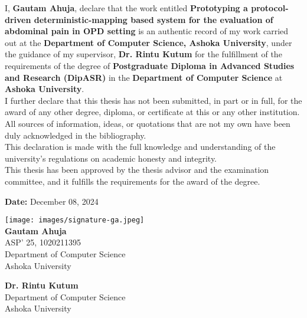 I, \textbf{Gautam Ahuja}, declare that the work entitled \textbf{Prototyping a protocol-driven deterministic-mapping based system for the evaluation of abdominal pain in OPD setting} is an authentic record of my work carried out at the \textbf{Department of Computer Science, Ashoka University}, under the guidance of my supervisor, \textbf{Dr. Rintu Kutum} for the fulfillment of the requirements of the degree of \textbf{Postgraduate Diploma in Advanced Studies and Research (DipASR)} in the \textbf{Department of Computer Science} at \textbf{Ashoka University}. \\%

\noindent I further declare that this thesis has not been submitted, in part or in full, for the award of any other degree, diploma, or certificate at this or any other institution. All sources of information, ideas, or quotations that are not my own have been duly acknowledged in the bibliography. \\ %


\noindent This declaration is made with the full knowledge and understanding of the university's regulations on academic honesty and integrity. \\%


\noindent This thesis has been approved by the thesis advisor and the examination committee, and it fulfills the requirements for the award of the degree.\\%

\begin{flushleft}
\textbf{Date:} December 08, 2024
\end{flushleft}

\begin{flushright}
\texttt{[image: images/signature-ga.jpeg]}\\
\textbf{Gautam Ahuja}\\
ASP' 25, 1020211395\\
Department of Computer Science\\
Ashoka University\\
\end{flushright}

\vspace{1.25cm}
\begin{flushright}
\textbf{Dr. Rintu Kutum}\\
Department of Computer Science\\
Ashoka University\\
\end{flushright}
